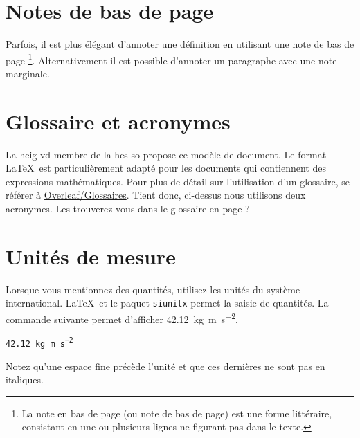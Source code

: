\section{Notes de bas de page}

 Parfois, il est plus élégant d'annoter une définition en utilisant une note de bas de page \footnote{La note en bas de page (ou note de bas de page) est une forme littéraire, consistant en une ou plusieurs lignes ne figurant pas dans le texte.}. Alternativement il est possible d'annoter un paragraphe avec une note marginale.

\section{Glossaire et acronymes}

La \Gls{heig-vd} membre de la \Gls{hes-so} propose ce modèle de document. Le format \LaTeX~est particulièrement adapté pour les documents qui contiennent des expressions mathématiques. Pour plus de détail sur l'utilisation d'un glossaire, se référer à \href{https://www.overleaf.com/learn/latex/Glossaries}{Overleaf/Glossaires}. Tient donc, ci-dessus nous utilisons deux acronymes. Les trouverez-vous dans le glossaire en page \pageref{glossaire} ?

\section{Unités de mesure}

Lorsque vous mentionnez des quantités, utilisez les unités du système international. \LaTeX~et le paquet \texttt{siunitx} permet la saisie de quantités. La commande suivante permet d'afficher \SI{42.12}{\kilo\gram\metre\per\square\second}.\par

\texttt{\SI{42.12}{\kilo\gram\metre\per\square\second}}\par

Notez qu'une espace fine précède l'unité et que ces dernières ne sont pas en italiques.
